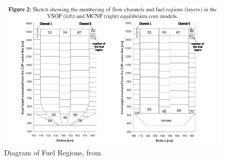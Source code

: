 \begin{figure}[H]
\centering
\includegraphics[width = \textwidth]{figures/bench-fuel-regions.png}
\caption{Diagram of Fuel Regions, from \cite{albornoz_mcnp_nodate}}
\label{fig:fuel-regions}
\end{figure}